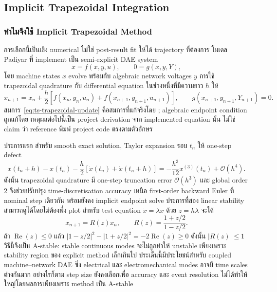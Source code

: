 \documentclass[12pt,a4paper]{article}
\begin{document}
\subsection{Implicit Trapezoidal Integration}

\subsubsection{ทำไมจึงใช้ Implicit Trapezoidal Method}

การเลือกนี้เป็นเชิง numerical ไม่ใช่ post-result fit ให้ได้ trajectory ที่ต้องการ โมเดล Padiyar ที่ implement เป็น semi-explicit DAE system
\begin{equation}
 \dot{x}=f(x,y,u),\qquad 0=g(x,y,Y),
 \label{eq:ts-dae-interface}
\end{equation}
โดย machine states $x$ evolve พร้อมกับ algebraic network voltages $y$ การใช้ trapezoidal quadrature กับ differential equation ในช่วงหนึ่งที่มีความยาว $h$ ให้
\begin{equation}
 x_{n+1}=x_n+\frac{h}{2}\left[f(x_n,y_n,u_n)
                  +f(x_{n+1},y_{n+1},u_{n+1})\right],
 \qquad g(x_{n+1},y_{n+1},Y_{n+1})=0.
 \label{eq:ts-trapezoidal-update}
\end{equation}
สมการ~\eqref{eq:ts-trapezoidal-update} คือสมการที่แก้จริงโดย ; algebraic endpoint condition ถูกแก้โดย  เหตุผลต่อไปนี้เป็น project derivation จาก implemented equation นั้น ไม่ใช่ claim ว่า reference พิมพ์ project code ตรงตามตัวอักษร

ประการแรก สำหรับ smooth exact solution, Taylor expansion รอบ $t_n$ ให้ one-step defect
\begin{equation}
x(t_n+h)-x(t_n)-\frac{h}{2}\left[\dot{x}(t_n)+\dot{x}(t_n+h)\right]
=-\frac{h^3}{12}x^{(3)}(t_n)+\mathcal{O}(h^4).
\label{eq:ts-trapezoidal-order}
\end{equation}
ดังนั้น trapezoidal quadrature มี one-step truncation error $\mathcal{O}(h^3)$ และ global order 2 จึงช่วยปรับปรุง time-discretisation accuracy เหนือ first-order backward Euler ที่ nominal step เดียวกัน พร้อมยังคง implicit endpoint solve ประการที่สอง linear stability สามารถดูได้โดยไม่ต้องพึ่ง plot สำหรับ test equation $\dot{x}=\lambda x$ ด้วย $z=h\lambda$ จะได้
\begin{equation}
 x_{n+1}=R(z)x_n,\qquad
 R(z)=\frac{1+z/2}{1-z/2}.
 \label{eq:ts-trapezoidal-stability}
\end{equation}
ถ้า $\operatorname{Re}(z)\le0$ แล้ว $|1-z/2|^2-|1+z/2|^2=-2\operatorname{Re}(z)\ge0$ ดังนั้น $|R(z)|\le1$ วิธีนี้จึงเป็น A-stable: stable continuous modes จะไม่ถูกทำให้ unstable เพียงเพราะ stability region ของ explicit method เล็กเกินไป ประเด็นนี้มีประโยชน์สำหรับ coupled machine--network DAE ซึ่ง electrical และ electromechanical modes อาจมี time scales ต่างกันมาก อย่างไรก็ตาม step size ยังคงเลือกเพื่อ accuracy และ event resolution ไม่ได้ทำให้ใหญ่โดยพลการเพียงเพราะ method เป็น A-stable
\end{document}
